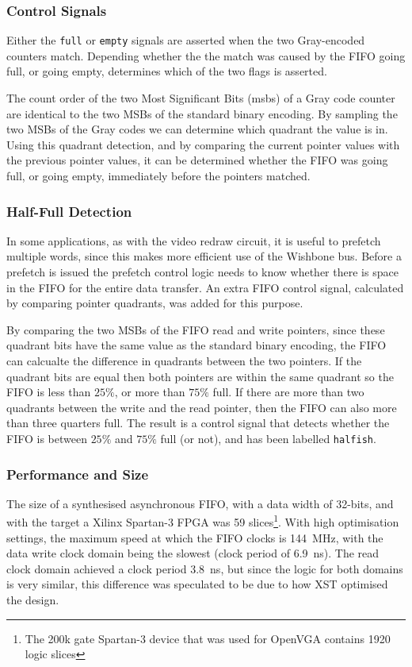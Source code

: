 \subsubsection{Control Signals}
Either the \texttt{full} or \texttt{empty} signals are asserted when the two
Gray-encoded counters match. Depending whether the the match was caused by the
FIFO going full, or going empty, determines which of the two flags is asserted.

The count order of the two Most Significant Bits (\gls{msb}s) of a Gray code counter are identical
to the two MSBs of the standard binary encoding. By sampling the two MSBs of the
Gray codes we can determine which quadrant the value is in. Using this quadrant
detection, and by comparing the current pointer values with the previous pointer
values, it can be determined whether the FIFO was going full, or going empty,
immediately before the pointers matched.


\subsubsection{Half-Full Detection}
In some applications, as with the video redraw circuit, it is useful to prefetch
multiple words, since this makes more efficient use of the Wishbone bus. Before a
prefetch is issued the prefetch control logic needs to know whether there is
space in the FIFO for the entire data transfer. An extra FIFO control signal,
calculated by comparing pointer quadrants, was added for this purpose.

By comparing the two MSBs of the FIFO read and write pointers, since these
quadrant bits have the same value as the standard binary encoding, the FIFO can
calcualte the difference in quadrants between the two pointers. If the quadrant
bits are equal then both pointers are within the same quadrant so the FIFO is
less than $25\%$, or more than $75\%$ full. If there are more than two quadrants
between the write and the read pointer, then the FIFO can also more than three
quarters full. The result is a control signal that detects whether the FIFO is
between $25\%$ and $75\%$ full (or not), and has been labelled \texttt{halfish}.


\subsubsection{Performance and Size}
\label{CLOCK_FIFO_Synth}

The size of a synthesised asynchronous FIFO, with a data width of 32-bits, and
with the target a Xilinx Spartan-3 FPGA was 59 slices\footnote{The 200k gate
Spartan-3 device that was used for OpenVGA contains 1920 logic slices}. With high
optimisation settings, the maximum speed at which the FIFO clocks is 144~MHz,
with the data write clock domain being the slowest (clock period of 6.9~ns). The
read clock domain achieved a clock period 3.8~ns, but since the logic for both
domains is very similar, this difference was speculated to be due to how XST
optimised the design.


